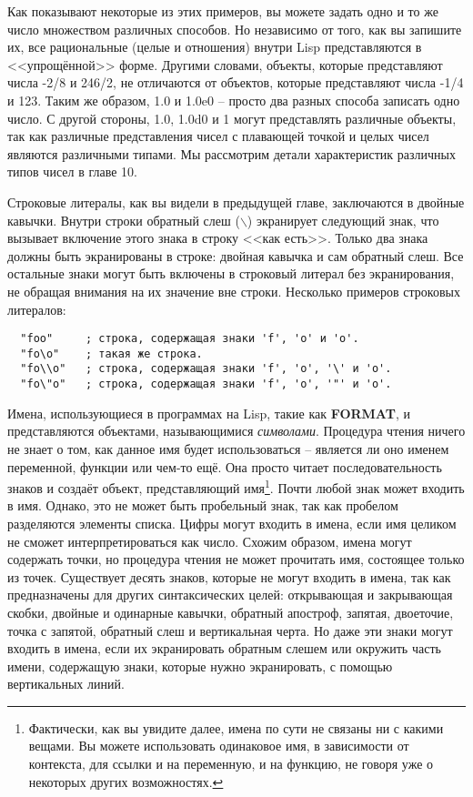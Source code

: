 Как показывают некоторые из этих примеров, вы можете задать одно и то же число множеством
различных способов. Но независимо от того, как вы запишите их, все рациональные (целые и
отношения) внутри Lisp представляются в <<упрощённой>> форме. Другими словами, объекты,
которые представляют числа -2/8 и 246/2, не отличаются от объектов, которые представляют
числа -1/4 и 123. Таким же образом, 1.0 и 1.0e0 -- просто два разных способа записать одно
число. С другой стороны, 1.0, 1.0d0 и 1 могут представлять различные объекты, так как
различные представления чисел с плавающей точкой и целых чисел являются различными
типами. Мы рассмотрим детали характеристик различных типов чисел в главе 10.

Строковые литералы, как вы видели в предыдущей главе, заключаются в двойные
кавычки. Внутри строки обратный слеш ($\backslash$) экранирует следующий знак, что
вызывает включение этого знака в строку <<как есть>>. Только два знака должны быть
экранированы в строке: двойная кавычка и сам обратный слеш. Все остальные знаки могут быть
включены в строковый литерал без экранирования, не обращая внимания на их значение вне
строки. Несколько примеров строковых литералов:

\begin{verbatim}
  "foo"     ; строка, содержащая знаки 'f', 'o' и 'o'.
  "fo\o"    ; такая же строка.
  "fo\\o"   ; строка, содержащая знаки 'f', 'o', '\' и 'o'.
  "fo\"o"   ; строка, содержащая знаки 'f', 'o', '"' и 'o'.
\end{verbatim}

Имена, использующиеся в программах на Lisp, такие как \textbf{FORMAT}, 
и  представляются объектами, называющимися \textit{символами}. Процедура чтения
ничего не знает о том, как данное имя будет использоваться -- является ли оно именем
переменной, функции или чем-то ещё. Она просто читает последовательность знаков и создаёт
объект, представляющий имя\footnote{Фактически, как вы увидите далее, имена по сути не
  связаны ни с какими вещами. Вы можете использовать одинаковое имя, в зависимости от
  контекста, для ссылки и на переменную, и на функцию, не говоря уже о некоторых других
  возможностях.}. Почти любой знак может входить в имя. Однако, это не может быть
пробельный знак, так как пробелом разделяются элементы списка. Цифры могут входить в
имена, если имя целиком не сможет интерпретироваться как число. Схожим образом, имена
могут содержать точки, но процедура чтения не может прочитать имя, состоящее только из
точек. Существует десять знаков, которые не могут входить в имена, так как предназначены
для других синтаксических целей: открывающая и закрывающая скобки, двойные и одинарные
кавычки, обратный апостроф, запятая, двоеточие, точка с запятой, обратный слеш и
вертикальная черта. Но даже эти знаки могут входить в имена, если их экранировать обратным
слешем или окружить часть имени, содержащую знаки, которые нужно экранировать, с помощью
вертикальных линий.

